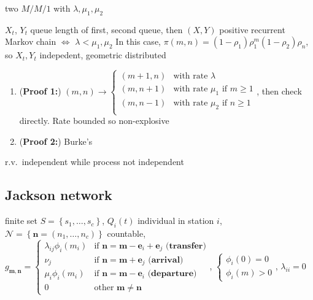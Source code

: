 \begin{setting}
    two $M/M/1$ with $\lambda, \mu_1, \mu_{2}$
\end{setting}

\begin{thm}
    $X_t$, $Y_t$ queue length of first, second queue, then $(X, Y)$ positive recurrent Markov chain $\iff$ $\lambda < \mu_1, \mu_2$
    In this case, $\pi(m, n) = (1 - \rho_1)\rho_1^m (1 - \rho_2)\rho_n$, so $X_t, Y_t$ indepedent, geometric distributed
\end{thm}
\begin{pf}
    \begin{enumerate}
        \item (\textbf{Proof 1:}) $(m , n) \rightarrow \begin{cases}
                                                           (m + 1, n) & \text{with rate }\lambda\\
                                                           (m , n + 1) & \text{with rate }\mu_1 \text{ if } m \geq 1\\
                                                           (m , n - 1) & \text{with rate }\mu_2 \text{ if } n \geq 1\\
        \end{cases}$, then check directly.
        Rate bounded so non-explosive
        \item (\textbf{Proof 2:}) Burke's
    \end{enumerate}
\end{pf}

\begin{fact}
    r.v.\ independent while process not independent
\end{fact}

\subsection{Jackson network}\label{subsec:jackson-network}

\begin{setting}
    finite set $S = \left\{ s_1, \dots, s_c \right\}$, $Q_i(t)$ individual in station $i$, $\mathcal{N} = \left\{ \bm n = (n_1, \dots, n_c) \right\}$ countable,
    $g_{\bm m, \bm n} =
    \begin{cases}
         \lambda_{ij}\phi_i(m_i) &\text{if } \bm n = \bm m - \bm e_i + \bm e_j \textbf{  (transfer)}\\
         \nu_j &\text{if } \bm n = \bm m + \bm e_j \textbf{  (arrival)}\\
         \mu_i\phi_i(m_i) &\text{if } \bm n = \bm m - \bm e_i \textbf{  (departure)}\\
         0 &\text{other } \bm m \neq \bm n
    \end{cases}
    $, $\begin{cases}
            \phi_i(0) = 0\\
            \phi_i(m) > 0
    \end{cases}$, $\lambda_{ii} = 0$
\end{setting}

